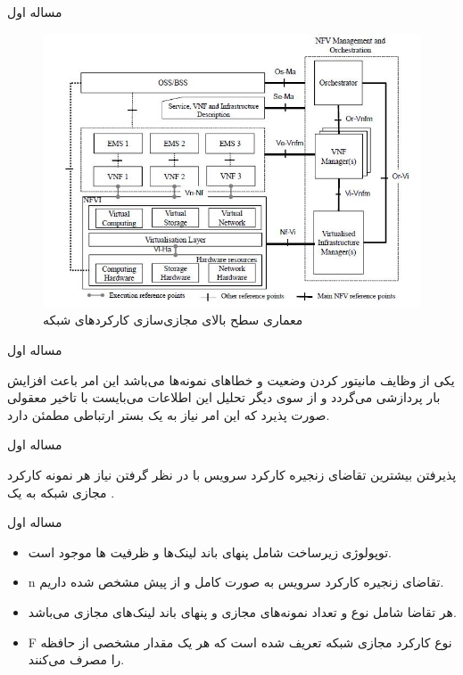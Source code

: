 \documentclass{beamer}
\makeatletter
\newcommand{\RTList}{\raggedleft\rightskip\@totalleftmargin}
\makeatother
\begin{document}
\begin{persian}
\begin{frame}{مساله اول}
	\begin{center}\begin{figure}
		\includegraphics[scale=0.4]{images/nfv-arch.jpg}
		\caption{معماری سطح بالای مجازی‌سازی کارکردهای شبکه}
	\end{figure}\end{center}
\end{frame}
\begin{frame}{مساله اول}
	\par
	یکی از وظایف  مانیتور کردن وضعیت و خطاهای نمونه‌ها می‌باشد
	این امر باعث افزایش بار پردازشی  می‌گردد
	و از سوی دیگر تحلیل این اطلاعات می‌بایست با تاخیر معقولی صورت پذیرد که این امر
	نیاز به یک بستر ارتباطی مطمئن دارد.
\end{frame}
\begin{frame}{مساله اول}
	\par
	پذیرفتن بیشترین تقاضای زنجیره‌ کارکرد سرویس با در نظر گرفتن نیاز هر نمونه کارکرد مجازی شبکه به یک .
\end{frame}
\begin{frame}{مساله اول}
	\begin{itemize}\RTList
		\item توپولوژی زیرساخت شامل پنهای باند لینک‌ها و ظرفیت ها موجود است.
		\item n تقاضای زنجیره‌ کارکرد سرویس به صورت کامل و از پیش مشخص شده داریم.
		\item هر تقاضا شامل نوع و تعداد نمونه‌های مجازی و پنهای باند لینک‌های مجازی می‌باشد.
		\item F نوع کارکرد مجازی شبکه تعریف شده است که هر یک مقدار مشخصی از حافظه را مصرف می‌کنند.

\end{itemize}
\end{frame}
\end{persian}
\end{document}
